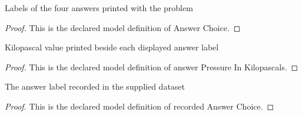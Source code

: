 \begin{definition}
  \label{def:physics:phyx-mini-0396:phyxminiproblems-problemphyxmini0396-answerchoice}
  Labels of the four answers printed with the problem
\end{definition}
\begin{proof}
  This is the declared model definition of Answer Choice.
\end{proof}
\begin{definition}
  \label{def:physics:phyx-mini-0396:phyxminiproblems-problemphyxmini0396-answerpressureinkilopascals}
  Kilopascal value printed beside each displayed answer label
\end{definition}
\begin{proof}
  This is the declared model definition of answer Pressure In Kilopascals.
\end{proof}
\begin{definition}
  \label{def:physics:phyx-mini-0396:phyxminiproblems-problemphyxmini0396-recordedanswerchoice}
  The answer label recorded in the supplied dataset
\end{definition}
\begin{proof}
  This is the declared model definition of recorded Answer Choice.
\end{proof}
